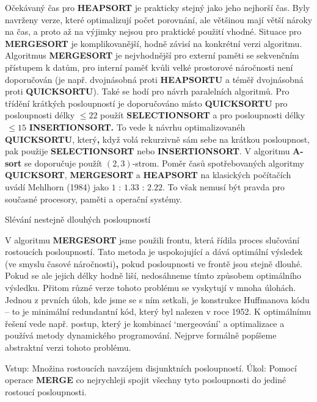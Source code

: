 \documentclass[a4paper,12pt]{article}
\begin{document}
Očekávaný čas pro {\bf HEAPSORT} je prakticky stejný jako 
jeho nej\-horší čas.  Byly navrženy verze, které optimalizují 
počet porov\-nání, ale většinou mají větší nároky na 
čas, a proto až na výjimky ne\-jsou pro praktické 
použití vhodné.  
Situace pro {\bf MERGESORT} je komplikovanější, hod\-ně závisí 
na konkrétní verzi algoritmu.  Algoritmus 
{\bf MER\-GE\-SORT} je nejvhodnější pro externí paměti se  
sekvenčním přístupem k datům, pro interní 
paměť kvůli velké prostorové náročnosti 
není doporučován (je např. dvojnásobná proti {\bf HEAPSORTU }
a téměř dvojnásobná proti {\bf QUICKSORTU}). Také se hodí pro 
návrh pa\-ra\-lelních algoritmů. Pro třídění 
krátkých posloupností je doporučováno místo {\bf QUICKSORTU }
pro posloupnosti délky $\le 22$ použít {\bf SELECTIONSORT} a pro 
posloupnosti délky $\,\le 15$  {\bf INSERTIONSORT.}
To vede k návrhu optimalizovanéh {\bf QUICKSORTU}, 
který{\bf ,}  když 
volá rekurzivně sám sebe na krátkou posloupnost, pak 
použije {\bf SELECTIONSORT} ne\-bo {\bf INSERTIONSORT}. V algoritmu {\bf A-sort }
se doporu\-ču\-je použít $(2,3)$-strom.  
Poměr časů spotřebovaných  
algoritmy {\bf QUICKSORT},  {\bf MERGESORT} a {\bf HEAPSORT} na 
klasických počítačích uvádí Mehlhorn (1984) jako  
$1$ : $1.33$ : $2.22$. To 
však nemusí  být pravda pro současné procesory, 
paměti a operační systémy. 

\head
Slévání nestejně dlouhých posloupností
\endhead

V algoritmu {\bf MERGESORT} jsme použili frontu, která 
řídila proces slučování rostoucích posloupností.  Tato metoda je uspokojující a 
dává optimální výsledek (ve smyslu časové náročnosti){\bf ,} pokud posloupnosti ve frontě jsou 
stejně dlouhé.  Pokud se ale jejich délky hodně liší, 
nedosáhneme tímto způsobem  
optimálního výsledku.  Přitom různé verze tohoto 
problému se vyskytují v mnoha úlohách. Jednou z prvních úloh, 
kde jsme se s ním setkali, je konstrukce 
Huffmanova k\'odu -- to je minimální redundantní k\'od, který byl 
nalezen v roce 1952. K optimálnímu řešení vede např. 
postup, který je kombinací `mergeování' a 
optimalizace a používá metody dynamického programování.  
Nejprve formálně popíšeme abstraktní verzi tohoto problému.  

Vstup: Množina rostoucích navzájem 
disjunktních posloupností.\newline 
Úkol:  Pomocí operace {\bf MERGE} co nejrychleji spojit 
všechny tyto posloupnosti do jediné rostoucí posloupnosti.  
\end{document}
